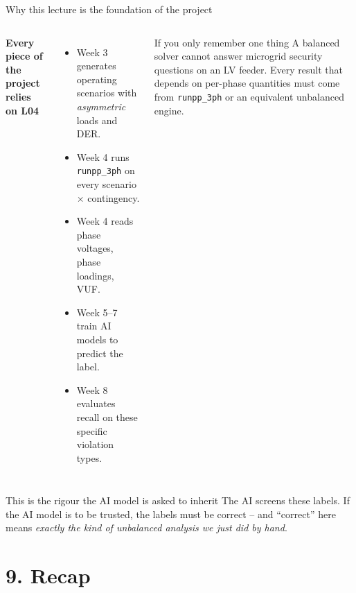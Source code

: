 \documentclass[aspectratio=169,10pt]{beamer}
\newcommand{\code}[1]{\texttt{#1}}
\begin{document}
\begin{frame}{Why this lecture is the foundation of the project}
\begin{columns}[T]
\textbf{Every piece of the project relies on L04}
\begin{itemize}
  \item Week 3 generates operating scenarios with \emph{asymmetric} loads and DER.
  \item Week 4 runs \code{runpp\_3ph} on every scenario $\times$ contingency.
  \item Week 4 reads phase voltages, phase loadings, VUF.
  \item Week 5--7 train AI models to predict the label.
  \item Week 8 evaluates recall on these specific violation types.
\end{itemize}
\begin{block}{If you only remember one thing}
A balanced solver cannot answer microgrid security questions on an LV feeder. Every result that depends on per-phase quantities must come from \code{runpp\_3ph} or an equivalent unbalanced engine.
\end{block}
\end{columns}
\vspace{0.5em}
\begin{alertblock}{This is the rigour the AI model is asked to inherit}
The AI screens these labels. If the AI model is to be trusted, the labels must be correct -- and ``correct'' here means \emph{exactly the kind of unbalanced analysis we just did by hand}.
\end{alertblock}
\end{frame}

\section*{9. Recap}
\end{document}
